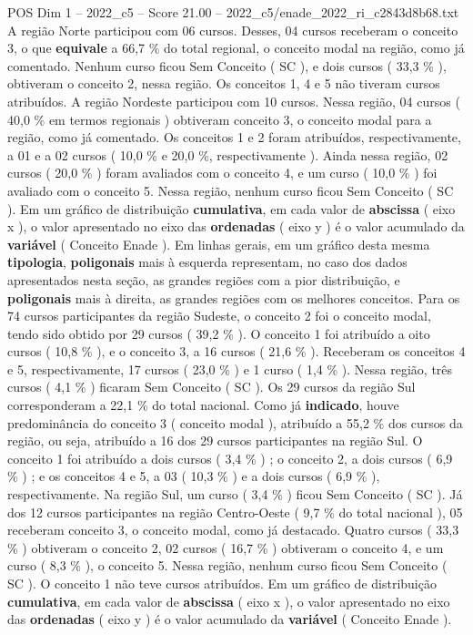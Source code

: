 \begin{textsample}{POS Dim 1 – 2022\_c5 – Score 21.00 – 2022\_c5/enade\_2022\_ri\_c2843d8b68.txt}
A região Norte participou com 06 cursos.
Desses, 04 cursos receberam o conceito 3, o que \textbf{equivale} a 66,7 \% do total regional, o conceito modal na região, como já comentado.
Nenhum curso ficou Sem Conceito ( SC ), e dois cursos ( 33,3 \% ), obtiveram o conceito 2, nessa região.
Os conceitos 1, 4 e 5 não tiveram cursos atribuídos.
A região Nordeste participou com 10 cursos.
Nessa região, 04 cursos ( 40,0 \% em termos regionais ) obtiveram conceito 3, o conceito modal para a região, como já comentado.
Os conceitos 1 e 2 foram atribuídos, respectivamente, a 01 e a 02 cursos ( 10,0 \% e 20,0 \%, respectivamente ).
Ainda nessa região, 02 cursos ( 20,0 \% ) foram avaliados com o conceito 4, e um curso ( 10,0 \% ) foi avaliado com o conceito 5.
Nessa região, nenhum curso ficou Sem Conceito ( SC ).
Em um gráfico de distribuição \textbf{cumulativa}, em cada valor de \textbf{abscissa} ( eixo x ), o valor apresentado no eixo das \textbf{ordenadas} ( eixo y ) é o valor acumulado da \textbf{variável} ( Conceito Enade ).
Em linhas gerais, em um gráfico desta mesma \textbf{tipologia}, \textbf{poligonais} mais à esquerda representam, no caso dos dados apresentados nesta seção, as grandes regiões com a pior distribuição, e \textbf{poligonais} mais à direita, as grandes regiões com os melhores conceitos.
Para os 74 cursos participantes da região Sudeste, o conceito 2 foi o conceito modal, tendo sido obtido por 29 cursos ( 39,2 \% ).
O conceito 1 foi atribuído a oito cursos ( 10,8 \% ), e o conceito 3, a 16 cursos ( 21,6 \% ).
Receberam os conceitos 4 e 5, respectivamente, 17 cursos ( 23,0 \% ) e 1 curso ( 1,4 \% ).
Nessa região, três cursos ( 4,1 \% ) ficaram Sem Conceito ( SC ).
Os 29 cursos da região Sul corresponderam a 22,1 \% do total nacional.
Como já \textbf{indicado}, houve predominância do conceito 3 ( conceito modal ), atribuído a 55,2 \% dos cursos da região, ou seja, atribuído a 16 dos 29 cursos participantes na região Sul.
O conceito 1 foi atribuído a dois cursos ( 3,4 \% ) ; o conceito 2, a dois cursos ( 6,9 \% ) ; e os conceitos 4 e 5, a 03 ( 10,3 \% ) e a dois cursos ( 6,9 \% ), respectivamente.
Na região Sul, um curso ( 3,4 \% ) ficou Sem Conceito ( SC ).
Já dos 12 cursos participantes na região Centro-Oeste ( 9,7 \% do total nacional ), 05 receberam conceito 3, o conceito modal, como já destacado.
Quatro cursos ( 33,3 \% ) obtiveram o conceito 2, 02 cursos ( 16,7 \% ) obtiveram o conceito 4, e um curso ( 8,3 \% ), o conceito 5.
Nessa região, nenhum curso ficou Sem Conceito ( SC ).
O conceito 1 não teve cursos atribuídos.
Em um gráfico de distribuição \textbf{cumulativa}, em cada valor de \textbf{abscissa} ( eixo x ), o valor apresentado no eixo das \textbf{ordenadas} ( eixo y ) é o valor acumulado da \textbf{variável} ( Conceito Enade ).

\end{textsample}
